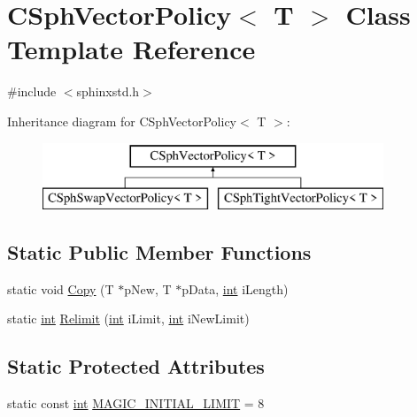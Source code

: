 \hypertarget{classCSphVectorPolicy}{\section{C\-Sph\-Vector\-Policy$<$ T $>$ Class Template Reference}
\label{classCSphVectorPolicy}
}


{\ttfamily \#include $<$sphinxstd.\-h$>$}

Inheritance diagram for C\-Sph\-Vector\-Policy$<$ T $>$\-:\begin{figure}[H]
\begin{center}
\leavevmode
\includegraphics[height=2.000000cm]{classCSphVectorPolicy}
\end{center}
\end{figure}
\subsection*{Static Public Member Functions}
\begin{DoxyCompactItemize}
\item 
static void \hyperlink{classCSphVectorPolicy_acd6d7b91ab30c88dfb90effd1647c102}{Copy} (T $\ast$p\-New, T $\ast$p\-Data, \hyperlink{sphinxexpr_8cpp_a4a26e8f9cb8b736e0c4cbf4d16de985e}{int} i\-Length)
\item 
static \hyperlink{sphinxexpr_8cpp_a4a26e8f9cb8b736e0c4cbf4d16de985e}{int} \hyperlink{classCSphVectorPolicy_a98d4713c552c5322d4289ea49e096b15}{Relimit} (\hyperlink{sphinxexpr_8cpp_a4a26e8f9cb8b736e0c4cbf4d16de985e}{int} i\-Limit, \hyperlink{sphinxexpr_8cpp_a4a26e8f9cb8b736e0c4cbf4d16de985e}{int} i\-New\-Limit)
\end{DoxyCompactItemize}
\subsection*{Static Protected Attributes}
\begin{DoxyCompactItemize}
\item 
static const \hyperlink{sphinxexpr_8cpp_a4a26e8f9cb8b736e0c4cbf4d16de985e}{int} \hyperlink{classCSphVectorPolicy_a3c72f01636730f15aeb472cae9369f25}{M\-A\-G\-I\-C\-\_\-\-I\-N\-I\-T\-I\-A\-L\-\_\-\-L\-I\-M\-I\-T} = 8
\end{DoxyCompactItemize}


